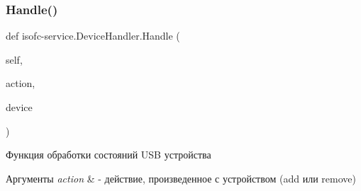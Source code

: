 \subsubsection{\texorpdfstring{Handle()}{Handle()}}
{\footnotesize\ttfamily def isofc-\/service.\+Device\+Handler.\+Handle (\begin{DoxyParamCaption}\item[{}]{self,  }\item[{}]{action,  }\item[{}]{device }\end{DoxyParamCaption})}



Функция обработки состояний U\+SB устройства 


\begin{DoxyParams}{Аргументы}
{\em action} & -\/ действие, произведенное с устройством (add или remove) \\
\hline
\end{DoxyParams}

